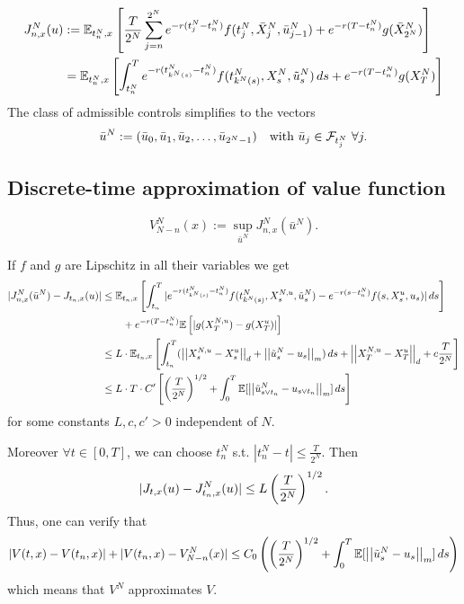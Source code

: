\begin{remark}
    \begin{align*}
        J_{n,x}^N(u) &:= \mathbb E_{t_n^N, x} \left[ \frac{T}{2^N} \sum_{j=n}^{2^N} e^{-r(t_j^N - t_n^N)} f(t_j^N, \bar{X}_j^N, \bar{u}_{j-1}^N) + e^{-r(T - t_n^N)} g(\bar{X}_{2^N}^N) \right] \\
        &= \mathbb E_{t_n^N, x} \left[ \int_{t_n^N}^T e^{-r(t_{k^N(s)}^N - t_n^N)} f(t_{k^N(s)}^N, X_s^N, \tilde{u}_s^N) \, ds + e^{-r(T - t_n^N)} g(X_T^N) \right]
    \end{align*}
    The class of admissible controls simplifies to the vectors
    \[ \bar{u}^N := (\bar{u}_0, \bar{u}_1, \bar{u}_2, \dots, \bar{u}_{2^N-1}) \quad \text{with } \bar{u}_j \in \mathcal{F}_{t_j^N} \ \forall j. \]
\end{remark}

\subsection{Discrete-time approximation of value function}

\begin{definition}
    \[ V_{N-n}^N(x) := \sup_{\bar{u}^N} J_{n,x}^N(\bar{u}^N). \]
\end{definition}

\begin{remark}
    If $f$ and $g$ are Lipschitz in all their variables we get
    \begin{align*}
        |J_{n,x}^N(\bar{u}^N) - J_{t_n,x}(u)| &\leq \mathbb E_{t_n,x} \left[ \int_{t_n}^T |e^{-r(t_{k^N(s)}^N - t_n^N)} f(t_{k^N(s)}^N, X_s^{N,u}, \tilde{u}_s^N) - e^{-r(s - t_n^N)} f(s, X_s^u, u_s)| \, ds \right] \\
        &\qquad + e^{-r(T - t_n^N)} \mathbb E \left[ |g(X_T^{N,u}) - g(X_T^u)| \right] \\
        &\leq L \cdot \mathbb E_{t_n,x} \left[ \int_{t_n}^T (\left|\left|X_s^{N,u} - X_s^u\right|\right|_d + \left|\left|\tilde{u}_s^N - u_s\right|\right|_m) \, ds + \left|\left|X_T^{N,u} - X_T^u\right|\right|_d + c \frac{T}{2^N} \right] \\
        &\leq L \cdot T \cdot C' \left[ \left(\frac{T}{2^N}\right)^{1/2} + \int_0^T \mathbb E[\left|\left|\tilde{u}_{s \vee t_n}^N - u_{s \vee t_n}\right|\right|_m] \, ds \right]
    \end{align*}
    for some constants $L, c, c' > 0$ independent of $N$.
    
    Moreover $\forall t \in [0,T]$, we can choose $t_n^N$ s.t. $|t_n^N - t| \leq \frac{T}{2^N}$. Then
    \[ |J_{t,x}(u) - J_{t_n,x}^N(u)| \leq L \left(\frac{T}{2^N}\right)^{1/2}. \]
    Thus, one can verify that
    \[ |V(t,x) - V(t_n,x)| + |V(t_n,x) - V_{N-n}^N(x)| \leq C_0 \left( \left(\frac{T}{2^N}\right)^{1/2} + \int_0^T \mathbb E[\left|\left|\tilde{u}_s^N - u_s\right|\right|_m] \, ds \right) \]
    which means that $V^N$ approximates $V$.
\end{remark}

